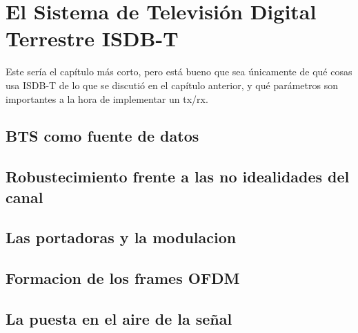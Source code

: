 \chapter{El Sistema de Televisión Digital Terrestre ISDB-T}

Este sería el capítulo más corto, pero está bueno que sea únicamente de qué cosas usa ISDB-T de lo que se discutió en el capítulo anterior, y qué parámetros son importantes a la hora de implementar un tx/rx. 

\section{BTS como fuente de datos}
\section{Robustecimiento frente a las no idealidades del canal}
\section{Las portadoras y la modulacion}
\section{Formacion de los frames OFDM}
\section{La puesta en el aire de la señal}